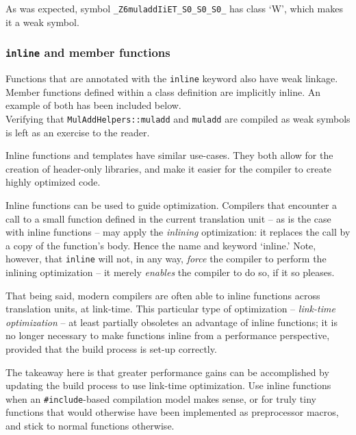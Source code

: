 \documentclass[12pt,a4paper]{article}
\newcommand{\labelname}[1]{\texttt{#1}}
\newcommand{\functionname}[1]{\labelname{#1}}
\newcommand{\filename}[1]{\texttt{#1}}
\begin{document}
As was expected, symbol \labelname{\_Z6muladdIiET\_S0\_S0\_S0\_} has class `W', which makes it a weak symbol.

\subsubsection{\texttt{inline} and member functions}

Functions that are annotated with the \texttt{inline} keyword also have weak linkage. Member functions defined within a class definition are implicitly inline. An example of both has been included below.\\



Verifying that \functionname{MulAddHelpers::muladd} and \functionname{muladd} are compiled as weak symbols is left as an exercise to the reader.

Inline functions and templates have similar use-cases. They both allow for the creation of header-only libraries, and make it easier for the compiler to create highly optimized code. 

Inline functions can be used to guide optimization. Compilers that encounter a call to a small function defined in the current translation unit -- as is the case with inline functions -- may apply the \emph{inlining} optimization: it replaces the call by a copy of the function's body. Hence the name and keyword `inline.' Note, however, that \texttt{inline} will not, in any way, \emph{force} the compiler to perform the inlining optimization -- it merely \emph{enables} the compiler to do so, if it so pleases. 

That being said, modern compilers are often able to inline functions across translation units, at link-time. This particular type of optimization -- \emph{link-time optimization} -- at least partially obsoletes an advantage of inline functions; it is no longer necessary to make functions inline from a performance perspective, provided that the build process is set-up correctly. 

The takeaway here is that greater performance gains can be accomplished by updating the build process to use link-time optimization. Use inline functions when an \texttt{\#include}-based compilation model makes sense, or for truly tiny functions that would otherwise have been implemented as preprocessor macros, and stick to normal functions otherwise.
\end{document}

